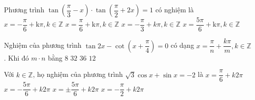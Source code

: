 \begin{ex}%
	Phương trình  $\tan\left(\dfrac{\pi}{3}-x\right)\cdot\tan\left(\dfrac{\pi}{2}+2x\right)=1$ có nghiệm là 
	\choice
	{$x=-\dfrac{\pi}{6} +\mathrm{k}\pi, k\in \mathbb{Z}$}
	{$x=\dfrac{\pi}{6} +\mathrm{k}\pi, k\in \mathbb{Z}$}
	{\True $x=-\dfrac{\pi}{3}+k\pi,k\in \mathbb{Z}$}
	{ $x=\dfrac{5\pi}{6} +\mathrm{k}\pi, k\in \mathbb{Z}$}
\end{ex} 
\begin{ex}%
	Nghiệm của phương trình $\tan2x-\cot\left( x+\dfrac{\pi}{4}\right) =0$ có dạng $x=\dfrac{\pi}{n}+\dfrac{k\pi}{m}, k\in \mathbb{Z}$. Khi đó $m\cdot n$ bằng
	\choice
	{$8$}
	{$32$}
	{\True $36$}
	{$12$}
\end{ex}
\begin{ex}%
	Với $k\in \mathbb{Z}$, họ nghiệm của phương trình $\sqrt{3}\cos x+\sin x=-2$ là
	\choice
	{$x=\dfrac{\pi}{6}+k2\pi$}
	{\True $x=-\dfrac{5\pi}{6}+k2\pi$}
	{$x=\pm \dfrac{5\pi}{6}+k2\pi$}
	{$x=-\dfrac{\pi}{2}+k2\pi$}
	\end{ex}
	
